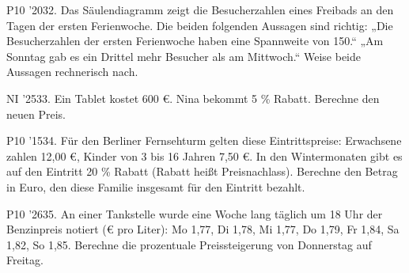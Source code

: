 \documentclass[11pt]{article}
\begin{document}
\begin{pfaufg}{P10 ’20}{32.}{}
Das Säulendiagramm zeigt die Besucherzahlen eines Freibads an den Tagen der ersten Ferienwoche. Die beiden folgenden Aussagen sind richtig: „Die Besucherzahlen der ersten Ferienwoche haben eine Spannweite von 150.“ „Am Sonntag gab es ein Drittel mehr Besucher als am Mittwoch.“ Weise beide Aussagen rechnerisch nach.
\par\smallskip\noindent {}\par
{}
\end{pfaufg}
\pfgruppe{}
\begin{pfaufg}{NI ’25}{33.}{}
Ein Tablet kostet 600 €. Nina bekommt 5 \% Rabatt. Berechne den neuen Preis.
\end{pfaufg}
\pfgruppe{}
\begin{pfaufg}{P10 ’15}{34.}{}
Für den Berliner Fernsehturm gelten diese Eintrittspreise: Erwachsene zahlen 12,00 €, Kinder von 3 bis 16 Jahren 7,50 €. In den Wintermonaten gibt es auf den Eintritt 20 \% Rabatt (Rabatt heißt Preisnachlass). Berechne den Betrag in Euro, den diese Familie insgesamt für den Eintritt bezahlt.
\end{pfaufg}
\pfgruppe{}
\begin{pfaufg}{P10 ’26}{35.}{}
An einer Tankstelle wurde eine Woche lang täglich um 18 Uhr der Benzinpreis notiert (€ pro Liter): Mo 1,77, Di 1,78, Mi 1,77, Do 1,79, Fr 1,84, Sa 1,82, So 1,85. Berechne die prozentuale Preissteigerung von Donnerstag auf Freitag.
\end{pfaufg}
\end{document}
